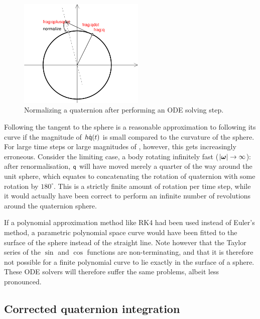 \begin{figure}
\centerline{\includegraphics[width=6cm]{figures/quaternion1}}
\caption{Normalizing a quaternion after performing an ODE solving step.
    \label{quatNormalizationFigure}}
\end{figure}

Following the tangent to the sphere is a reasonable approximation to following its curve if the
magnitude of $h \dot{\mathsf{q}}(t)$ is small compared to the curvature of the sphere.
For large time steps or large magnitudes of \ve{\omega}, however, this gets increasingly
erroneous. Consider the limiting case, a body rotating infinitely fast
($\norm{\ve{\omega}} \rightarrow \infty$): after renormalisation, $\mathsf{q}$ will have moved merely
a quarter of the way around the unit sphere, which equates to concatenating the rotation of
quaternion  with some rotation by $180^\circ$. This is a strictly finite amount of rotation
per time step, while it would actually have been correct to perform an infinite number of
revolutions around the quaternion sphere.

If a polynomial approximation method like RK4 had been used instead of Euler's method, a parametric
polynomial space curve would have been fitted to the surface of the sphere instead of the straight
line. Note however that the Taylor series of the $\sin$ and $\cos$ functions are non-terminating,
and that it is therefore not possible for a finite polynomial curve to lie exactly in the surface
of a sphere. These ODE solvers will therefore suffer the same problems, albeit less pronounced.


\subsection{Corrected quaternion integration\label{quatIntegrationDerivation}}

